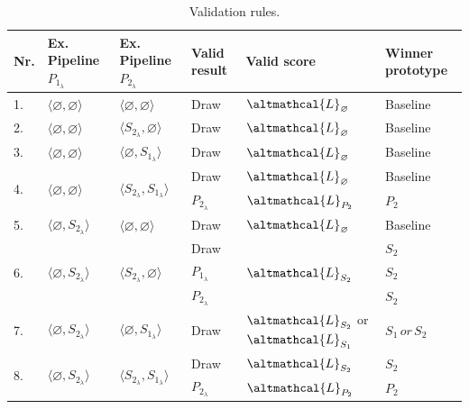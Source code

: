 \begin{table}[t]
\footnotesize
\centering
\begin{threeparttable}
\caption{
    Validation rules.
    }
\begin{tabular}{lp{2.3cm}p{2.3cm}p{2cm}p{2cm}p{2.5cm}}
\toprule
Nr. & Ex. Pipeline $P_{1_{\lambda}}$ & Ex. Pipeline $P_{2_{\lambda}}$ & Valid result & Valid score & Winner prototype\\\toprule
        1. &$\langle \varnothing, \varnothing \rangle$ & $\langle \varnothing, \varnothing \rangle$ & Draw          & $\altmathcal{L}_{\varnothing}$ &  Baseline \\ \hline
        2. &$\langle \varnothing, \varnothing \rangle$ & $\langle S_{2_{\lambda}}, \varnothing \rangle$ & Draw          & $\altmathcal{L}_{\varnothing}$ & Baseline \\ \hline
        3. &$\langle \varnothing, \varnothing \rangle$ & $\langle \varnothing, S_{1_{\lambda}} \rangle$ & Draw          & $\altmathcal{L}_{\varnothing}$ & Baseline \\ \hline
        \multirow{2}{*}{4.} &\multirow{2}{*}{$\langle \varnothing, \varnothing \rangle$} & \multirow{2}{*}{$\langle S_{2_{\lambda}}, S_{1_{\lambda}} \rangle$} & Draw & $\altmathcal{L}_{\varnothing}$ & Baseline \\
        & & & $P_{2_{\lambda}}$ & $\altmathcal{L}_{P_2}$ & $P_2$\\ \hline
        5. & $\langle \varnothing, S_{2_{\lambda}} \rangle$ & $\langle \varnothing, \varnothing \rangle$ & Draw          & $\altmathcal{L}_{\varnothing}$ & Baseline \\ \hline
        \multirow{3}{*}{6.} & \multirow{3}{*}{$\langle \varnothing, S_{2_{\lambda}} \rangle$} & \multirow{3}{*}{$\langle S_{2_{\lambda}}, \varnothing \rangle$} & Draw &  \multirow{3}{*}{$\altmathcal{L}_{S_2}$}  & $S_2$ \\
        & & & $P_{1_{\lambda}}$ & & $S_2$ \\
        & & & $P_{2_{\lambda}}$ & & $S_2$ \\ \hline
        7. &$\langle \varnothing, S_{2_{\lambda}} \rangle$ & $\langle \varnothing, S_{1_{\lambda}} \rangle$ & Draw & $\altmathcal{L}_{S_2}$ or $\altmathcal{L}_{S_1}$ & $S_{1}\,or\, S_2$ \\ \hline
        \multirow{2}{*}{8.} & \multirow{2}{*}{$\langle \varnothing, S_{2_{\lambda}} \rangle$} & \multirow{2}{*}{$\langle S_{2_{\lambda}}, S_{1_{\lambda}} \rangle$} & Draw & $\altmathcal{L}_{S_2}$ & $S_2$\\
        & & & $P_{2_{\lambda}}$ & $\altmathcal{L}_{P_2}$ & $P_2$ \\ \hline

\end{tabular}
\end{threeparttable}
\end{table}
